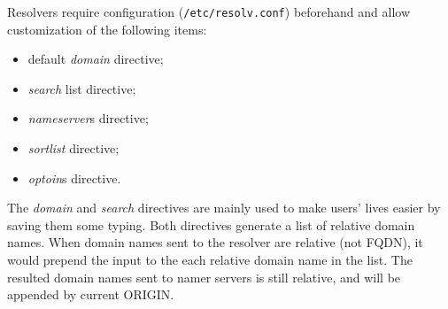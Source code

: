 Resolvers require configuration (\verb|/etc/resolv.conf|)
beforehand and allow customization of the following items:

\begin{itemize}
\item default \textit{domain} directive;
\item \textit{search} list directive;
\item \textit{nameserver}s directive;
\item \textit{sortlist} directive;
\item \textit{optoin}s directive.
\end{itemize}

The \textit{domain} and \textit{search} directives are mainly used
to make users' lives easier by saving them some typing. Both
directives generate a list of relative domain names. When domain
names sent to the resolver are relative (not FQDN), it would
prepend the input to the each relative domain name in the
list. The resulted domain names sent to namer servers is still
relative, and will be appended by current ORIGIN.

